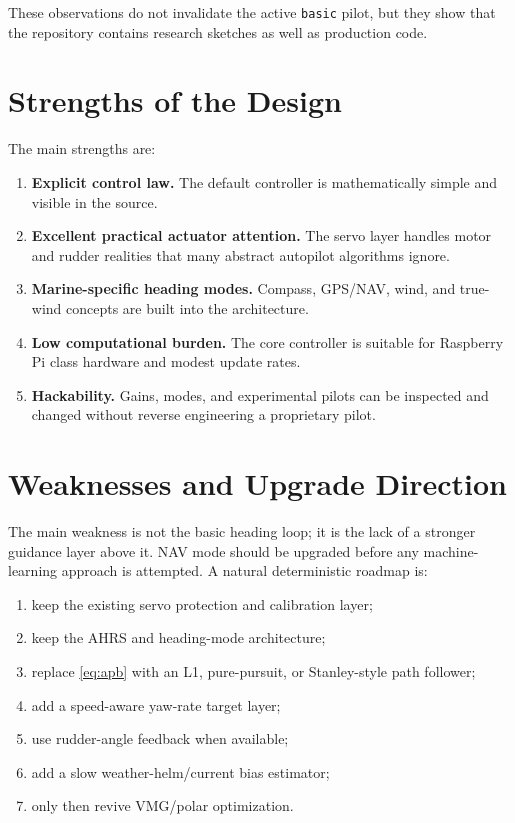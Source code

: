 \documentclass[10pt,twocolumn]{article}
\begin{document}
These observations do not invalidate the active \texttt{basic} pilot, but they show that
the repository contains research sketches as well as production code.

\section{Strengths of the Design}

The main strengths are:
\begin{enumerate}
\item \textbf{Explicit control law.}  The default controller is mathematically simple and
visible in the source.
\item \textbf{Excellent practical actuator attention.}  The servo layer handles motor and
rudder realities that many abstract autopilot algorithms ignore.
\item \textbf{Marine-specific heading modes.}  Compass, GPS/NAV, wind, and true-wind
concepts are built into the architecture.
\item \textbf{Low computational burden.}  The core controller is suitable for Raspberry Pi
class hardware and modest update rates.
\item \textbf{Hackability.}  Gains, modes, and experimental pilots can be inspected and
changed without reverse engineering a proprietary pilot.
\end{enumerate}

\section{Weaknesses and Upgrade Direction}

The main weakness is not the basic heading loop; it is the lack of a stronger guidance
layer above it.  NAV mode should be upgraded before any machine-learning approach is
attempted.  A natural deterministic roadmap is:
\begin{enumerate}
\item keep the existing servo protection and calibration layer;
\item keep the AHRS and heading-mode architecture;
\item replace \cref{eq:apb} with an L1, pure-pursuit, or Stanley-style path follower;
\item add a speed-aware yaw-rate target layer;
\item use rudder-angle feedback when available;
\item add a slow weather-helm/current bias estimator;
\item only then revive VMG/polar optimization.
\end{enumerate}
\end{document}
